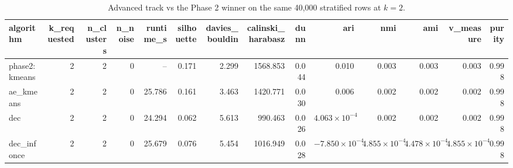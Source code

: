 \begin{table}[htbp]
\centering
\begin{tabular}{lrrrrrrrrrrrrr}
\toprule
algorithm & k\_requested & n\_clusters & n\_noise & runtime\_s & silhouette & davies\_bouldin & calinski\_harabasz & dunn & ari & nmi & ami & v\_measure & purity \\
\midrule
phase2:kmeans & 2 & 2 & 0 & -- & 0.171 & 2.299 & 1568.853 & 0.044 & 0.010 & 0.003 & 0.003 & 0.003 & 0.998 \\
ae\_kmeans & 2 & 2 & 0 & 25.786 & 0.161 & 3.463 & 1420.771 & 0.030 & 0.006 & 0.002 & 0.002 & 0.002 & 0.998 \\
dec & 2 & 2 & 0 & 24.294 & 0.062 & 5.613 & 990.463 & 0.026 & $4.063\times 10^{-4}$ & 0.002 & 0.002 & 0.002 & 0.998 \\
dec\_infonce & 2 & 2 & 0 & 25.679 & 0.076 & 5.454 & 1016.949 & 0.028 & $-7.850\times 10^{-4}$ & $4.855\times 10^{-4}$ & $4.478\times 10^{-4}$ & $4.855\times 10^{-4}$ & 0.998 \\
\bottomrule
\end{tabular}
\caption{Advanced track vs the Phase 2 winner on the same 40{,}000 stratified rows at $k=2$.}
\label{tab:track}
\end{table}
